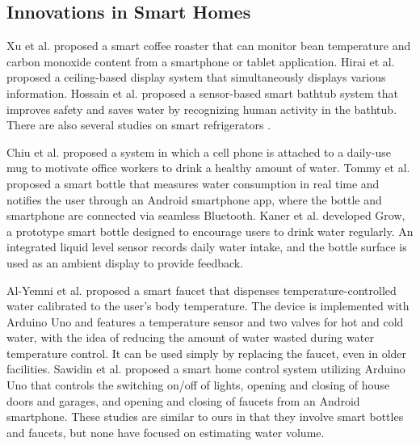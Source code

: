\documentclass[sigconf]{acmart}
\begin{document}
\subsection{Innovations in Smart Homes}
Xu et al.\cite{smart_home1} proposed a smart coffee roaster that can monitor bean temperature and carbon monoxide content from a smartphone or tablet application.
Hirai et al.\cite{smart_home2} proposed a ceiling-based display system that simultaneously displays various information.
Hossain et al.\cite{smart_home3} proposed a sensor-based smart bathtub system that improves safety and saves water by recognizing human activity in the bathtub.
There are also several studies on smart refrigerators \cite{smart_refrigerator1, smart_refrigerator2, smart_refrigerator3, smart_refrigerator4}. \par

Chiu et al.\cite{PlayfulBottle} proposed a system in which a cell phone is attached to a daily-use mug to motivate office workers to drink a healthy amount of water.
Tommy et al.\cite{SmartBottle} proposed a smart bottle that measures water consumption in real time and notifies the user through an Android smartphone app, where the bottle and smartphone are connected via seamless Bluetooth.
Kaner et al.\cite{GROW} developed Grow, a prototype smart bottle designed to encourage users to drink water regularly. An integrated liquid level sensor records daily water intake, and the bottle surface is used as an ambient display to provide feedback.\par

Al-Yemni et al.\cite{smart_faucet2} proposed a smart faucet that dispenses temperature-controlled water calibrated to the user’s body temperature. The device is implemented with Arduino Uno and features a temperature sensor and two valves for hot and cold water, with the idea of reducing the amount of water wasted during water temperature control. It can be used simply by replacing the faucet, even in older facilities.
Sawidin et al.\cite{smart_faucet3} proposed a smart home control system utilizing Arduino Uno that controls the switching on/off of lights, opening and closing of house doors and garages, and opening and closing of faucets from an Android smartphone.
These studies are similar to ours in that they involve smart bottles and faucets, but none have focused on estimating water volume.


\end{document}
